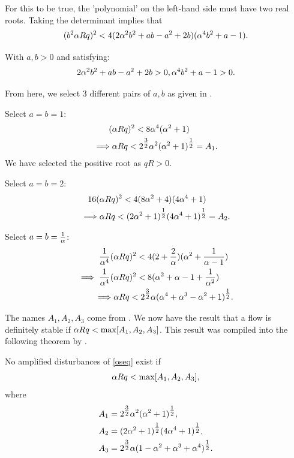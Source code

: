 For this to be true, the 'polynomial' on the left-hand side must have two real roots. Taking the determinant implies that
\begin{equation}
    (b^2 \alpha R q)^2 < 4(2 \alpha^2 b^2 + ab - a^2 + 2b)(\alpha^4 b^2 + a - 1).
\end{equation}

With $ a, b > 0$ and satisfying:
\begin{gather}
    2 \alpha^2 b^2 + ab - a^2 + 2b > 0, \alpha^4 b^2 + a - 1 > 0.
\end{gather}

From here, we select 3 different pairs of $ a, b $ as given in \citet{synge1938hydrodynamical}.

Select $ a = b = 1$:
\begin{align}
    (&\alpha R q)^2 < 8 \alpha^4 (\alpha^2 + 1) \nonumber\\
    \implies &\alpha R q < 2^{\tfrac{3}{2}} \alpha^2 (\alpha^2 + 1)^{\tfrac{1}{2}} = A_1.
\end{align}
We have selected the positive root as $ q R > 0$.

Select $ a = b = 2 $:
\begin{align}
    16 (&\alpha R q)^2 < 4 (8 \alpha^2 + 4)( 4 \alpha^4 + 1) \nonumber\\
    \implies &\alpha R q < (2 \alpha^2 + 1)^{\tfrac{1}{2}}(4 \alpha^4 + 1)^{\tfrac{1}{2}} = A_2.
\end{align}

Select $ a = b = \frac{1}{\alpha}$:
\begin{align}
    \frac{1}{\alpha^4} (&\alpha R q)^2 < 4 (2 + \frac{2}{\alpha})(\alpha^2 + \frac{1}{\alpha - 1}) \nonumber\\
    \implies \frac{1}{\alpha^4} (&\alpha R q)^2 < 8 (\alpha^2 + \alpha - 1 + \frac{1}{\alpha^2}) \nonumber\\
    \implies &\alpha R q < 2^{\tfrac{3}{2}} \alpha (\alpha^4 + \alpha^3 - \alpha^2 + 1)^{\tfrac{1}{2}}.
\end{align}

The names $ A_1, A_2, A_3 $ come from \citet{synge1938hydrodynamical}. We now have the result that a flow is definitely stable if $ \alpha R q < \max[A_1, A_2, A_3]$. This result was compiled into the following theorem by \citet{joseph1968eigenvalue}.

\begin{theorem}
No amplified disturbances of \eqref{oseq} exist if 
\begin{equation}
    \alpha R q < \max[A_1, A_2, A_3],
\end{equation}
where 
\begin{align}
    A_1 &= 2^{\tfrac{3}{2}} \alpha^2 (\alpha^2 + 1)^{\tfrac{1}{2}}, \nonumber\\
    A_2 &= (2 \alpha^2 + 1)^{\tfrac{1}{2}}(4 \alpha^4 + 1)^{\tfrac{1}{2}}, \nonumber\\
    A_3 &= 2^{\tfrac{3}{2}} \alpha (1 - \alpha^2 + \alpha^3 + \alpha^4)^{\tfrac{1}{2}}.
    \label{sbounds}
\end{align}
\end{theorem}

